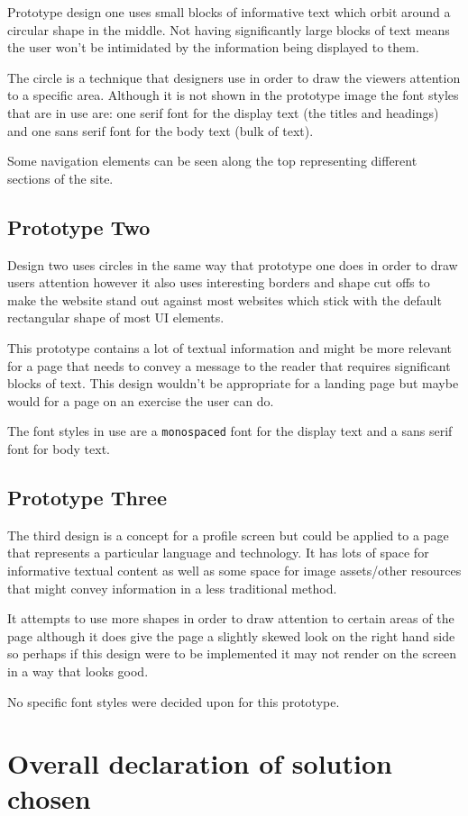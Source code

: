 Prototype design one uses small blocks of informative text which orbit around a circular shape in the middle. Not having significantly large blocks of text means the user won't be intimidated by the information being displayed to them. 

The circle is a technique that designers use in order to draw the viewers attention to a specific area. Although it is not shown in the prototype image the font styles that are in use are: one serif font for the display text (the titles and headings) and one sans serif font for the body text (bulk of text).

Some navigation elements can be seen along the top representing different sections of the site.

\subsection{Prototype Two}

Design two uses circles in the same way that prototype one does in order to draw users attention however it also uses interesting borders and shape cut offs to make the website stand out against most websites which stick with the default rectangular shape of most UI elements.

This prototype contains a lot of textual information and might be more relevant for a page that needs to convey a message to the reader that requires significant blocks of text. This design wouldn't be appropriate for a landing page but maybe would for a page on an exercise the user can do.

The font styles in use are a \texttt{monospaced} font for the display text and a sans serif font for body text.

\subsection{Prototype Three}

The third design is a concept for a profile screen but could be applied to a page that represents a particular language and technology. It has lots of space for informative textual content as well as some space for image assets/other resources that might convey information in a less traditional method.

It attempts to use more shapes in order to draw attention to certain areas of the page although it does give the page a slightly skewed look on the right hand side so perhaps if this design were to be implemented it may not render on the screen in a way that looks good.

No specific font styles were decided upon for this prototype.

\section{Overall declaration of solution chosen}


\pagebreak

